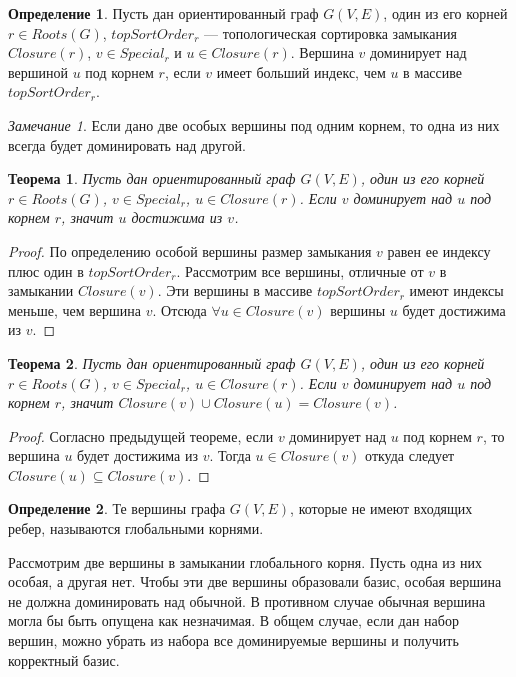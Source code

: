 \documentclass[12pt,a4paper,oneside,openany]{article}
\newtheorem{theorem}{Теорема}
\theoremstyle{definition}
\newtheorem{definition}{Определение}[]
\theoremstyle{lemma}
\theoremstyle{remark}
\newtheorem{remark}{Замечание}[]
\begin{document}
\begin{definition}
Пусть дан ориентированный граф $G(V,E)$, один из его корней $r \in Roots(G)$,
$topSortOrder_r$ --- топологическая сортировка замыкания $Closure(r)$, $v \in Special_r$ и $u \in Closure(r)$.
Вершина $v$ доминирует над вершиной $u$ под корнем $r$, если $v$ имеет больший индекс, чем $u$ в массиве $topSortOrder_r$.
\end{definition}

\begin{remark}
Если дано две особых вершины под одним корнем, то одна из них всегда будет доминировать над другой.
\end{remark}

\begin{theorem}
Пусть дан ориентированный граф $G(V,E)$, один из его корней $r \in Roots(G)$,
$v \in Special_r$, $u \in Closure(r)$. Если $v$ доминирует над $u$ под корнем $r$, значит $u$ достижима из $v$.
\end{theorem}

\begin{proof}
По определению особой вершины размер замыкания $v$ равен ее индексу плюс один в $topSortOrder_r$.
Рассмотрим все вершины, отличные от $v$ в замыкании $Closure(v)$.
Эти вершины в массиве $topSortOrder_r$ имеют индексы меньше, чем вершина $v$.
Отсюда $\forall u \in Closure(v)$ вершины $u$ будет достижима из $v$.
\end{proof}

\begin{theorem}
Пусть дан ориентированный граф $G(V,E)$, один из его корней $r \in Roots(G)$,
$v \in Special_r$, $u \in Closure(r)$.
Если $v$ доминирует над $u$ под корнем $r$, значит $Closure(v) \cup Closure(u) = Closure(v)$.
\end{theorem}

\begin{proof}
Согласно предыдущей теореме, если $v$ доминирует над $u$ под корнем $r$,
то вершина $u$ будет достижима из $v$.
Тогда $u \in Closure(v)$ откуда следует $Closure(u) \subseteq Closure(v)$.
\end{proof}

\begin{definition}
Те вершины графа $G(V,E)$, которые не имеют входящих ребер, называются глобальными корнями.
\end{definition}

Рассмотрим две вершины в замыкании глобального корня.
Пусть одна из них особая, а другая нет.
Чтобы эти две вершины образовали базис, особая вершина не должна доминировать над обычной.
В противном случае обычная вершина могла бы быть опущена как незначимая.
В общем случае, если дан набор вершин, можно убрать из набора все доминируемые вершины и получить корректный базис.
\end{document}
